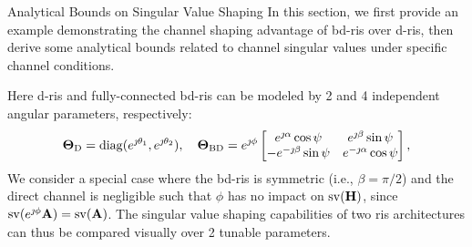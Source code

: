 	\begin{section}{Analytical Bounds on Singular Value Shaping}
	\label{sc:singular_value}
	In this section, we first provide an example demonstrating the channel shaping advantage of \gls{bd}-\gls{ris} over \gls{d}-\gls{ris}, then derive some analytical bounds related to channel singular values under specific channel conditions.

	\begin{example}\label{eg:d_vs_bd}
		Here \gls{d}-\gls{ris} and fully-connected \gls{bd}-\gls{ris} can be modeled by 2 and 4 independent angular parameters, respectively:
		\begin{equation*}
			\mathbf{\Theta}_\mathrm{D} = \operatorname{diag}(e^{\jmath \theta_1}, e^{\jmath \theta_2}), \quad
			\mathbf{\Theta}_\mathrm{BD} = e^{\jmath \phi} \begin{bmatrix}
				e^{\jmath \alpha} \cos \psi  & e^{\jmath \beta} \sin \psi   \\
				-e^{-\jmath \beta} \sin \psi & e^{-\jmath \alpha} \cos \psi
			\end{bmatrix},
		\end{equation*}
		We consider a special case where the \gls{bd}-\gls{ris} is symmetric (i.e., $\beta = \pi / 2$) and the direct channel is negligible such that $\phi$ has no impact on $\operatorname{sv}(\mathbf{H})$, since $\operatorname{sv}(e^{\jmath \phi} \mathbf{A}) = \operatorname{sv}(\mathbf{A})$.
		The singular value shaping capabilities of two \gls{ris} architectures can thus be compared visually over 2 tunable parameters.
		\begin{figure}
			\centering

\end{figure}
\end{example}
\end{section}
